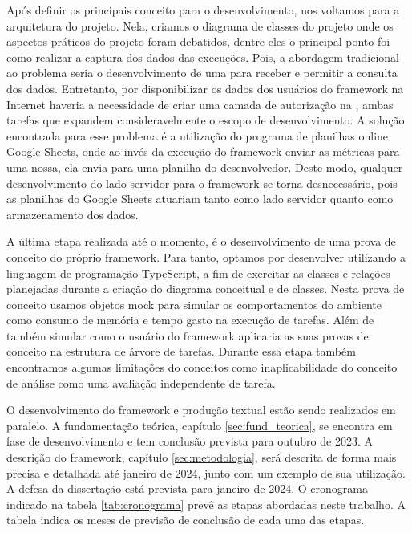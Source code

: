 \documentclass[12pt]{tcc}
\begin{document}
Após definir os principais conceito para o desenvolvimento, nos voltamos para a arquitetura do projeto.
Nela, criamos o diagrama de classes do projeto onde os aspectos práticos do projeto foram debatidos, dentre eles o principal ponto foi como realizar a captura dos dados das execuções.
Pois, a abordagem tradicional ao problema seria o desenvolvimento de uma  para receber e permitir a consulta dos dados.
Entretanto, por disponibilizar os dados dos usuários do framework na Internet haveria a necessidade de criar uma camada de autorização na , ambas tarefas que expandem consideravelmente o escopo de desenvolvimento.
A solução encontrada para esse problema é a utilização do programa de planilhas online Google Sheets, onde ao invés da execução do framework enviar as métricas para uma  nossa, ela envia para uma planilha do desenvolvedor.
Deste modo, qualquer desenvolvimento do lado servidor para o framework se torna desnecessário, pois as planilhas do Google Sheets atuariam tanto como lado servidor quanto como armazenamento dos dados.

A última etapa realizada até o momento, é o desenvolvimento de uma prova de conceito do próprio framework.
Para tanto, optamos por desenvolver utilizando a linguagem de programação TypeScript, a fim de exercitar as classes e relações planejadas durante a criação do diagrama conceitual e de classes.
Nesta prova de conceito usamos objetos mock para simular os comportamentos do ambiente como consumo de memória e tempo gasto na execução de tarefas.
Além de também simular como o usuário do framework aplicaria as suas provas de conceito na estrutura de árvore de tarefas.
Durante essa etapa também encontramos algumas limitações do conceitos como inaplicabilidade do conceito de análise como uma avaliação independente de tarefa.

O desenvolvimento do framework e produção textual estão sendo realizados em paralelo.
A fundamentação teórica, capítulo \ref{sec:fund_teorica}, se encontra em fase de desenvolvimento e tem conclusão prevista para outubro de 2023.
A descrição do framework, capítulo \ref{sec:metodologia}, será descrita de forma mais precisa e detalhada até janeiro de 2024, junto com um exemplo de sua utilização.
A defesa da dissertação está prevista para janeiro de 2024. O cronograma indicado na tabela \ref{tab:cronograma} prevê as etapas abordadas neste trabalho.
A tabela indica os meses de previsão de conclusão de cada uma das etapas.
\end{document}
